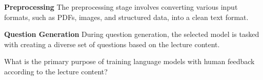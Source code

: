 

{
	\bigbreak
    \textbf{Preprocessing}
	The preprocessing stage involves converting various input formats, such as PDFs, images, and structured data, into a clean text format. 
	
	\bigbreak
	\bigbreak
    \bigbreak
    \textbf{Question Generation}
	During question generation, the selected model is tasked with creating a diverse set of questions based on the lecture content. 
	\begin{tcolorbox}[skin=widget,
		coltitle=black,
		colframe=brsu_blue!30,
		colback=brsu_blue!10,
  		adjusted title=Example multiple choice question:,
		boxrule=2mm]
	What is the primary purpose of training language models with human feedback according to the lecture content?
	\tcblower


\end{tcolorbox}}
